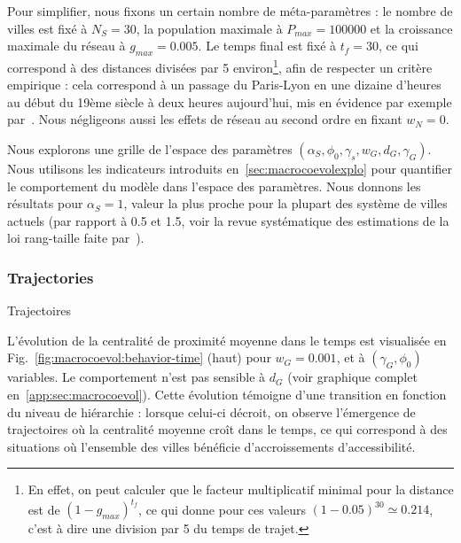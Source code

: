 Pour simplifier, nous fixons un certain nombre de méta-paramètres : le nombre de villes est fixé à $N_S = 30$, la population maximale à $P_{max} = 100000$ et la croissance maximale du réseau à $g_{max} = 0.005$. Le temps final est fixé à $t_f = 30$, ce qui correspond à des distances divisées par 5 environ\footnote{En effet, on peut calculer que le facteur multiplicatif minimal pour la distance est de $(1 - g_{max})^{t_f}$, ce qui donne pour ces valeurs $(1 - 0.05)^{30} \simeq 0.214$, c'est à dire une division par 5 du temps de trajet.}, afin de respecter un critère empirique : cela correspond à un passage du Paris-Lyon en une dizaine d'heures au début du 19ème siècle à deux heures aujourd'hui, mis en évidence par exemple par~\cite{thevenin2013mapping}. Nous négligeons aussi les effets de réseau au second ordre en fixant $w_N = 0$.




Nous explorons une grille de l'espace des paramètres $(\alpha_S,\phi_0,\gamma_s,w_G,d_G,\gamma_G)$. Nous utilisons les indicateurs introduits en~\ref{sec:macrocoevolexplo} pour quantifier le comportement du modèle dans l'espace des paramètres. Nous donnons les résultats pour $\alpha_S = 1$, valeur la plus proche pour la plupart des système de villes actuels (par rapport à 0.5 et 1.5, voir la revue systématique des estimations de la loi rang-taille faite par~\cite{10.1371/journal.pone.0183919}).



\subsubsection{Trajectories}{Trajectoires}


L'évolution de la centralité de proximité moyenne dans le temps est visualisée en Fig.~\ref{fig:macrocoevol:behavior-time} (haut) pour $w_G = 0.001$, et à $(\gamma_G,\phi_0)$ variables. Le comportement n'est pas sensible à $d_G$ (voir graphique complet en~\ref{app:sec:macrocoevol}). Cette évolution témoigne d'une transition en fonction du niveau de hiérarchie : lorsque celui-ci décroit, on observe l'émergence de trajectoires où la centralité moyenne croît dans le temps, ce qui correspond à des situations où l'ensemble des villes bénéficie d'accroissements d'accessibilité.



